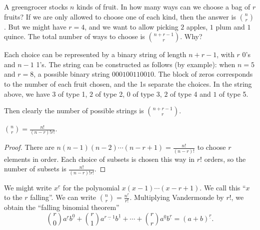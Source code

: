 \documentclass[a4paper]{article}
\begin{document}
\begin{eg}
  A greengrocer stocks $n$ kinds of fruit. In how many ways can we choose a bag of $r$ fruits? If we are only allowed to choose one of each kind, then the answer is $\binom{n}{r}$. But we might have $r = 4$, and we want to allow picking $2$ apples, $1$ plum and $1$ quince. The total number of ways to choose is $\binom{n + r - 1}{r}$. Why?

  Each choice can be represented by a binary string of length $n + r - 1$, with $r$ 0's and $n - 1$ 1's. The string can be constructed as follows (by example): when $n = 5$ and $r=8$, a possible binary string $000100110010$. The block of zeros corresponds to the number of each fruit chosen, and the 1s separate the choices. In the string above, we have $3$ of type 1, $2$ of type 2, $0$ of type 3, $2$ of type 4 and $1$ of type 5.

  Then clearly the number of possible strings is $\binom{n + r - 1}{r}$.
\end{eg}

\begin{prop}
  $\displaystyle\binom{n}{r} = \frac{n!}{(n - r)!r!}$.
\end{prop}

\begin{proof}
  There are $n(n - 1)(n - 2)\cdots (n - r + 1) = \frac{n!}{(n - r)!}$ to choose $r$ elements in order. Each choice of subsets is chosen this way in $r!$ orders, so the number of subsets is $\frac{n!}{(n - r)!r!}$.
\end{proof}

We might write $x^{\underline{r}}$ for the polynomial $x(x - 1)\cdots (x - r + 1)$. We call this ``$x$ to the $r$ falling''. We can write $\displaystyle \binom{n}{r} = \frac{n^{\underline{r}}}{r!}$. Multiplying Vandermonde by $r!$, we obtain the ``falling binomial theorem''
\[
  \binom{r}{0}a^{\underline{r}}b^{\underline{0}} + \binom{r}{1}a^{\underline{r - 1}}b^{\underline{1}} + \cdots + \binom{r}{r}a^{\underline{0}}b^{\underline{r}} = (a + b)^{\underline{r}}.
\]
\end{document}

